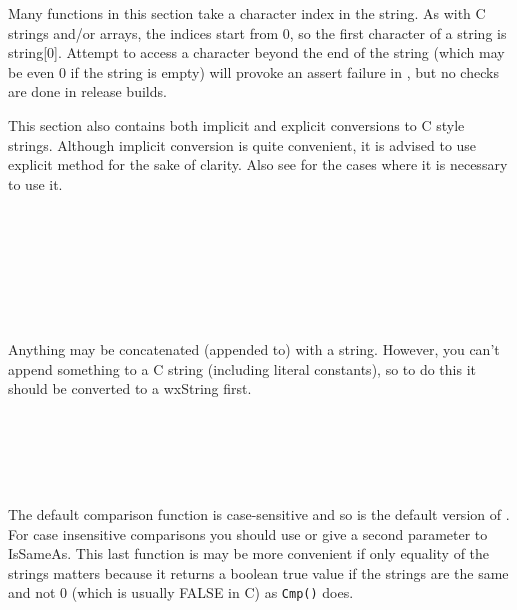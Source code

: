 
Many functions in this section take a character index in the string. As with C
strings and/or arrays, the indices start from $0$, so the first character of a
string is string[$0$]. Attempt to access a character beyond the end of the
string (which may be even $0$ if the string is empty) will provoke an assert
failure in , but no checks are done in
release builds.

This section also contains both implicit and explicit conversions to C style
strings. Although implicit conversion is quite convenient, it is advised to use
explicit  method for the sake of clarity. Also
see  for the cases where it is necessary to
use it.

\\
\\
\\
\\
\\
\\


Anything may be concatenated (appended to) with a string. However, you can't
append something to a C string (including literal constants), so to do this it
should be converted to a wxString first.

\\
\\
\\
\\


The default comparison function  is case-sensitive and
so is the default version of . For case
insensitive comparisons you should use  or
give a second parameter to IsSameAs. This last function is may be more
convenient if only equality of the strings matters because it returns a boolean
true value if the strings are the same and not 0 (which is usually FALSE in C)
as {\tt Cmp()} does.

